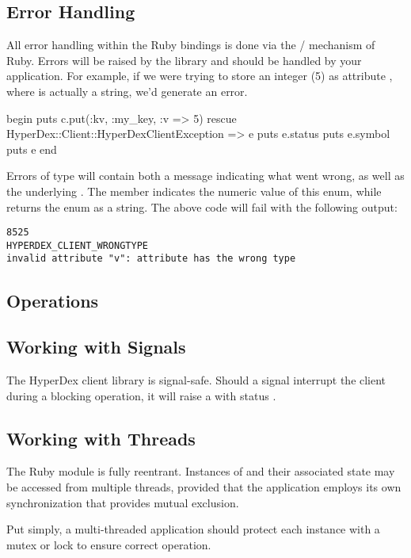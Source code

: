 \subsection{Error Handling}
\label{sec:api:ruby:error-handling}

All error handling within the Ruby bindings is done via the
/ mechanism of Ruby.  Errors will be raised by the
library and should be handled by your application.  For example, if we were
trying to store an integer (5) as attribute , where  is
actually a string, we'd generate an error.

\begin{rubycode}
begin
    puts c.put(:kv, :my_key, {:v => 5})
rescue HyperDex::Client::HyperDexClientException => e
    puts e.status
    puts e.symbol
    puts e
end
\end{rubycode}

Errors of type  will contain both a message
indicating what went wrong, as well as the underlying .  The member  indicates the numeric
value of this enum, while  returns the enum as a string.  The above
code will fail with the following output:

\begin{verbatim}
8525
HYPERDEX_CLIENT_WRONGTYPE
invalid attribute "v": attribute has the wrong type
\end{verbatim}

\subsection{Operations}
\label{sec:api:ruby:ops}


\pagebreak

\subsection{Working with Signals}
\label{sec:api:ruby:signals}

The HyperDex client library is signal-safe.  Should a signal interrupt the
client during a blocking operation, it will raise a
 with status .

\subsection{Working with Threads}
\label{sec:api:ruby:threads}

The Ruby module is fully reentrant.  Instances of
 and their associated state may be accessed from
multiple threads, provided that the application employs its own synchronization
that provides mutual exclusion.

Put simply, a multi-threaded application should protect each 
instance with a mutex or lock to ensure correct operation.
